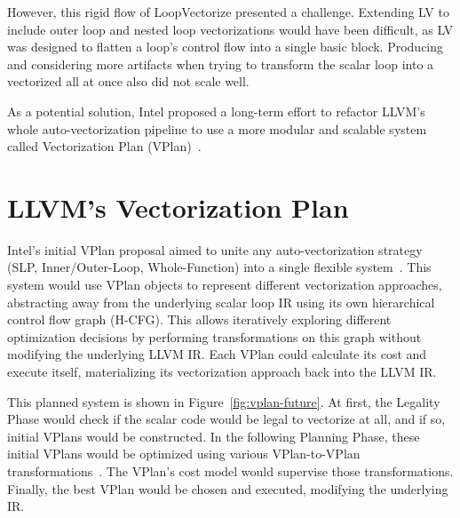 \documentclass[sigplan,11pt,nonacm]{acmart}
\begin{document}
However, this rigid flow of LoopVectorize presented a challenge. Extending LV to include outer loop 
and nested loop vectorizations would have been difficult, as LV was designed to flatten a
loop's control flow into a single basic block. Producing and considering more artifacts when trying to 
transform the scalar loop into a vectorized all at once also did not scale well.

As a potential solution, Intel proposed a long-term effort to refactor LLVM's whole auto-vectorization
pipeline to use a more modular and scalable system called Vectorization Plan (VPlan)~\cite{llvmextloopvec}.




\section{LLVM's Vectorization Plan}
\label{sec:vplan}

Intel's initial VPlan proposal aimed to unite any 
auto-vectorization strategy (SLP, Inner/Outer-Loop, Whole-Function) into a 
single flexible system~\cite{llvmextloopvec,llvmintrvplan,llvmvplanstate}. 
This system would use VPlan objects to represent different 
vectorization approaches, abstracting away from the underlying scalar loop IR using its own 
hierarchical control flow graph (H-CFG). This allows iteratively exploring different 
optimization decisions by performing transformations on this graph without modifying the 
underlying LLVM IR.
Each VPlan could calculate its cost and execute itself, materializing its vectorization 
approach back into the LLVM IR.

This planned system is shown in Figure~\ref{fig:vplan-future}. At first, the Legality 
Phase would check if the scalar code would be legal to vectorize at all, and if so, 
initial VPlans would be constructed. In the following Planning Phase, these initial 
VPlans would be optimized using various VPlan-to-VPlan transformations~\cite{llvmouterloopstatus}. 
The VPlan's cost model would supervise those transformations. Finally, the best VPlan 
would be chosen and executed, modifying the underlying IR.
\end{document}
